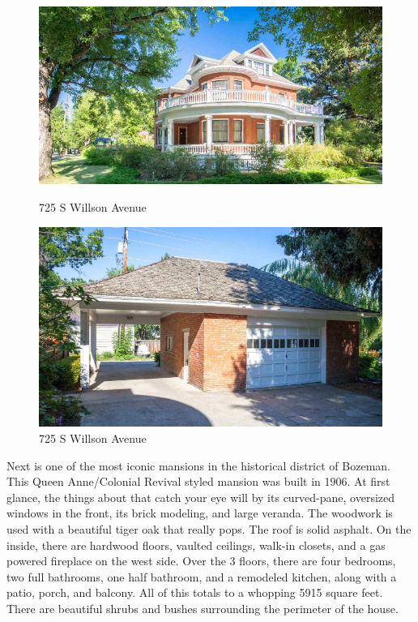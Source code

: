 \documentclass[10pt,letterpaper]{article}
\begin{document}
\begin{figure}[h]
	\centering
		\begin{minipage}[b]{0.4\textwidth}
			\includegraphics[width=\textwidth]{house2pic1.png}
    		\caption{725 S Willson Avenue}
  		\end{minipage}
  \hfill
  		\begin{minipage}[b]{0.4\textwidth}
    		\includegraphics[width=\textwidth]{house2pic2.png}
    		\caption{725 S Willson Avenue}
  		\end{minipage}
\end{figure}

Next is one of the most iconic mansions in the historical district of Bozeman. This Queen Anne/Colonial Revival styled mansion was built in 1906. At first glance, the things about that catch your eye will by its curved-pane, oversized windows in the front, its brick modeling, and large veranda. The woodwork is used with a beautiful tiger oak that really pops. The roof is solid asphalt. On the inside, there are hardwood floors, vaulted ceilings, walk-in closets, and a gas powered fireplace on the west side. Over the 3 floors, there are four bedrooms, two full bathrooms, one half bathroom, and a  remodeled kitchen, along with a patio, porch, and balcony. All of this totals to a whopping 5915 square feet. There are beautiful shrubs and bushes surrounding the perimeter of the house.
\newpage 
\end{document}
